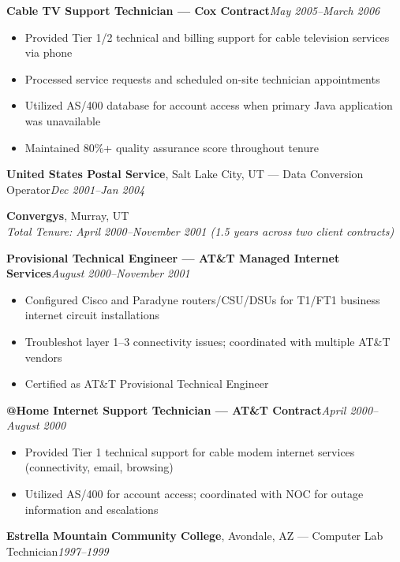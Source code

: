 \documentclass[9pt,letterpaper]{extarticle}
\begin{document}
\textbf{Cable TV Support Technician --- Cox Contract}\hfill\textit{May 2005--March 2006}
\begin{itemize}
  \item Provided Tier 1/2 technical and billing support for cable television services via phone
  \item Processed service requests and scheduled on-site technician appointments
  \item Utilized AS/400 database for account access when primary Java application was unavailable
  \item Maintained 80\%+ quality assurance score throughout tenure
\end{itemize}

\vspace{3pt}
\noindent\textbf{United States Postal Service}, Salt Lake City, UT --- Data Conversion Operator\hfill\textit{Dec 2001--Jan 2004}

\vspace{5pt}
\noindent\textbf{Convergys}, Murray, UT\\
\textit{Total Tenure: April 2000--November 2001 (1.5 years across two client contracts)}

\smallskip
{}
\textbf{Provisional Technical Engineer --- AT\&T Managed Internet Services}\hfill\textit{August 2000--November 2001}
\begin{itemize}
  \item Configured Cisco and Paradyne routers/CSU/DSUs for T1/FT1 business internet circuit installations
  \item Troubleshot layer 1--3 connectivity issues; coordinated with multiple AT\&T vendors
  \item Certified as AT\&T Provisional Technical Engineer
\end{itemize}

\textbf{@Home Internet Support Technician --- AT\&T Contract}\hfill\textit{April 2000--August 2000}
\begin{itemize}
  \item Provided Tier 1 technical support for cable modem internet services (connectivity, email, browsing)
  \item Utilized AS/400 for account access; coordinated with NOC for outage information and escalations
\end{itemize}

\vspace{3pt}
\noindent\textbf{Estrella Mountain Community College}, Avondale, AZ --- Computer Lab Technician\hfill\textit{1997--1999}
\end{document}
